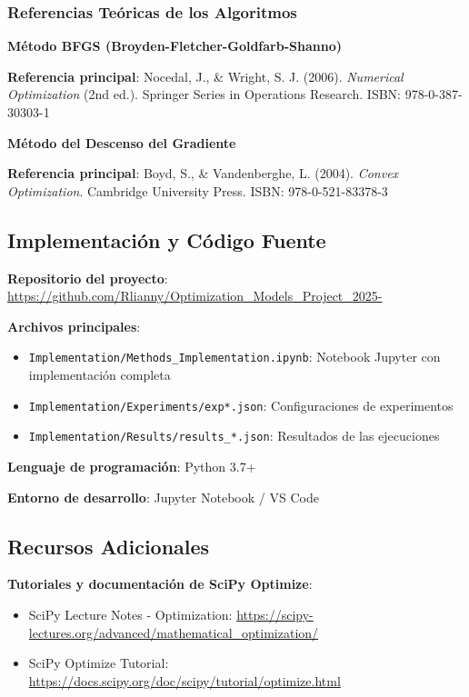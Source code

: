 \documentclass[12pt,a4paper]{article}
\begin{document}
\subsubsection*{Referencias Teóricas de los Algoritmos}

\textbf{Método BFGS (Broyden-Fletcher-Goldfarb-Shanno)}

\textbf{Referencia principal}:
Nocedal, J., \& Wright, S. J. (2006). \textit{Numerical Optimization} (2nd ed.). Springer Series in Operations Research. ISBN: 978-0-387-30303-1

\textbf{Método del Descenso del Gradiente}

\textbf{Referencia principal}:
Boyd, S., \& Vandenberghe, L. (2004). \textit{Convex Optimization}. Cambridge University Press. ISBN: 978-0-521-83378-3

\subsection*{Implementación y Código Fuente}

\textbf{Repositorio del proyecto}: \url{https://github.com/Rlianny/Optimization_Models_Project_2025-}

\textbf{Archivos principales}:
\begin{itemize}
    \item \texttt{Implementation/Methods\_Implementation.ipynb}: Notebook Jupyter con implementación completa
    \item \texttt{Implementation/Experiments/exp*.json}: Configuraciones de experimentos
    \item \texttt{Implementation/Results/results\_*.json}: Resultados de las ejecuciones
\end{itemize}

\textbf{Lenguaje de programación}: Python 3.7+

\textbf{Entorno de desarrollo}: Jupyter Notebook / VS Code

\subsection*{Recursos Adicionales}

\textbf{Tutoriales y documentación de SciPy Optimize}:
\begin{itemize}
    \item SciPy Lecture Notes - Optimization: \url{https://scipy-lectures.org/advanced/mathematical_optimization/}
    \item SciPy Optimize Tutorial: \url{https://docs.scipy.org/doc/scipy/tutorial/optimize.html}
\end{itemize}
\end{document}
